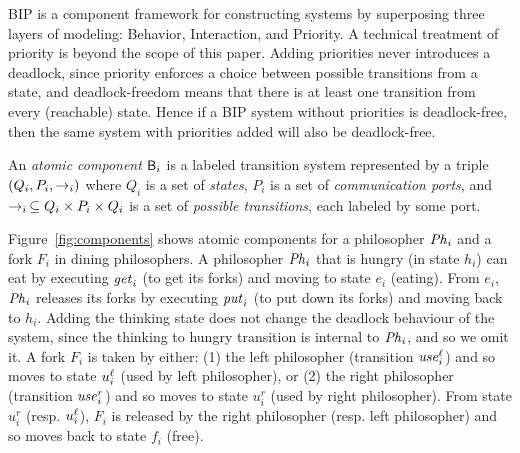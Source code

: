 
BIP is a component framework for constructing systems by superposing three layers of modeling: Behavior, Interaction,
and Priority.
%
A technical treatment of priority is beyond the scope of this paper. Adding priorities never introduces a deadlock,
since priority enforces a choice between possible transitions from a state, and deadlock-freedom means that there is at
least one transition from every (reachable) state.  Hence if a BIP system without priorities is deadlock-free, then the
same system with priorities added will also be deadlock-free.

\begin{definition}
An  {\em atomic component} $\mathsf{B}_i$ is a labeled transition system represented by a triple
$(Q_i, P_i, \stackrel{}{\rightarrow}_i)$ where $Q_i$ is a set of {\em states}, $P_i$ is a set of {\em communication ports}, and
$\stackrel{}{\rightarrow}_i\, \subseteq Q_i \times P_i \times Q_i$ is a set of {\em possible transitions}, each labeled by some port.
\end{definition}


Figure~\ref{fig:components} shows atomic components for a philosopher $\mathit{Ph}_i$ and a fork $F_i$ in dining philosophers.
%
A philosopher $\mathit{Ph}_i$ that is hungry (in state $h_i$) can eat by executing $\mathit{get}_i$ (to get its forks) and moving to state $e_i$ (eating). From $e_i$,
$\mathit{Ph}_i$ releases its forks by executing $\mathit{put}_i$ (to put down its forks) and moving back to $h_i$.
%
Adding the thinking state does not change the deadlock behaviour of the system, since the thinking to hungry transition is internal to $\mathit{Ph}_i$, and so we
omit it.
%
A fork $F_i$ is taken by either: (1) the left philosopher (transition $\mathit{use}_i^\ell$) and so moves to state $u_i^\ell$ (used by left philosopher), or (2) the
right philosopher (transition $\mathit{use}_i^r$) and so moves to state $u_i^r$ (used by right philosopher). From state $u_i^r$ (resp. $u_i^\ell$), $F_i$ is released by
the right philosopher (resp. left philosopher) and so moves back to state $f_i$ (free).
%



